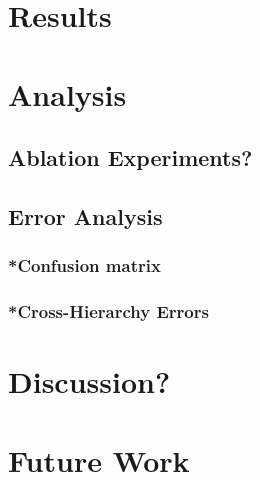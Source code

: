 \section{Results}

\section{Analysis}
\subsection{Ablation Experiments?}
\subsection{Error Analysis}
\subsubsection{*Confusion matrix}
\subsubsection{*Cross-Hierarchy Errors}

\section{Discussion?}

\section{Future Work}

